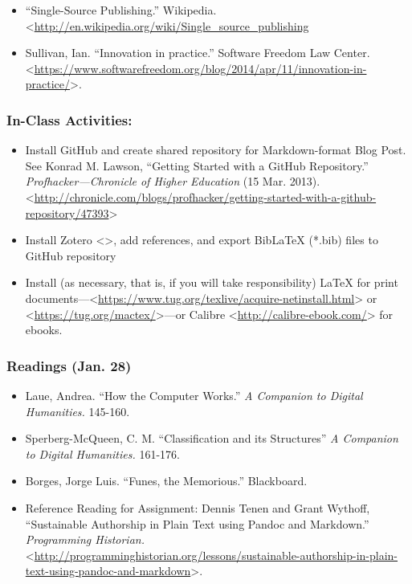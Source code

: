 \documentclass[]{article}
\begin{document}
\begin{itemize}
\itemsep1pt\parskip0pt
\item
  ``Single-Source Publishing.'' Wikipedia.
  \textless{}\url{http://en.wikipedia.org/wiki/Single_source_publishing}
\item
  Sullivan, Ian. ``Innovation in practice.'' Software Freedom Law
  Center.
  \textless{}\url{https://www.softwarefreedom.org/blog/2014/apr/11/innovation-in-practice/}\textgreater{}.
\end{itemize}

\subsubsection{In-Class Activities:}\label{in-class-activities-1}

\begin{itemize}
\itemsep1pt\parskip0pt
\item
  Install GitHub and create shared repository for Markdown-format Blog
  Post. See Konrad M. Lawson, ``Getting Started with a GitHub
  Repository.'' \emph{Profhacker---Chronicle of Higher Education} (15
  Mar. 2013).
  \textless{}\url{http://chronicle.com/blogs/profhacker/getting-started-with-a-github-repository/47393}\textgreater{}
\item
  Install Zotero \textless{}\href{}{}\textgreater{}, add references, and
  export BibLaTeX (*.bib) files to GitHub repository
\item
  Install (as necessary, that is, if you will take responsibility) LaTeX
  for print
  documents---\textless{}\url{https://www.tug.org/texlive/acquire-netinstall.html}\textgreater{}
  or \textless{}\url{https://tug.org/mactex/}\textgreater{}---or Calibre
  \textless{}\url{http://calibre-ebook.com/}\textgreater{} for ebooks.
\end{itemize}

\subsubsection{Readings (Jan. 28)}\label{readings-jan.-28}

\begin{itemize}
\itemsep1pt\parskip0pt
\item
  Laue, Andrea. ``How the Computer Works.'' \emph{A Companion to Digital
  Humanities.} 145-160.
\item
  Sperberg-McQueen, C. M. ``Classification and its Structures'' \emph{A
  Companion to Digital Humanities.} 161-176.
\item
  Borges, Jorge Luis. ``Funes, the Memorious.'' Blackboard.
\item
  Reference Reading for Assignment: Dennis Tenen and Grant Wythoff,
  ``Sustainable Authorship in Plain Text using Pandoc and Markdown.''
  \emph{Programming Historian.}
  \textless{}\url{http://programminghistorian.org/lessons/sustainable-authorship-in-plain-text-using-pandoc-and-markdown}\textgreater{}.
\end{itemize}
\end{document}
